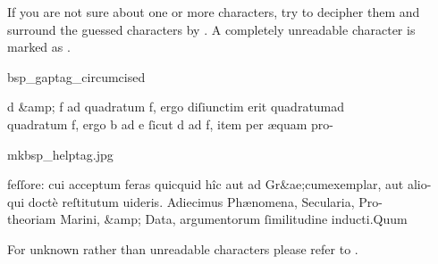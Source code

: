 \begin{mainrule}
  If you are not sure about one or more characters, try to decipher them and surround the guessed characters by . %
  A completely unreadable character is marked as .
\end{mainrule}


\vspace{2mm}
\begin{sampleImage}[ 1: \, a stain]{bsp_gaptag_circumcised}
\begin{typeLatin}
 \someText
d &amp; f ad quadratum f, ergo diſiunctim erit quadratum\lwr ad \\
quadratum f, ergo b ad e ſicut d ad f, item per æquam pro- \\
\someText {}
\end{typeLatin}

\end{sampleImage}

\begin{sampleImage}{mkbsp_helptag.jpg}

\begin{typeLatin}
 \someText
feſſore: cui acceptum feras quicquid hîc aut ad Gr&ae;cum\lwr exemplar, aut alio- \\
qui doctè reſtitutum uideris. Adiecimus Phænomena, Secularia, Pro- \\
theoriam Marini, &amp; Data, argumentorum ſimilitudine inducti.\lwr Quum
\someText {}
\end{typeLatin}
\end{sampleImage}

\begin{crossref}
For unknown rather than unreadable characters please refer to .
\end{crossref}


